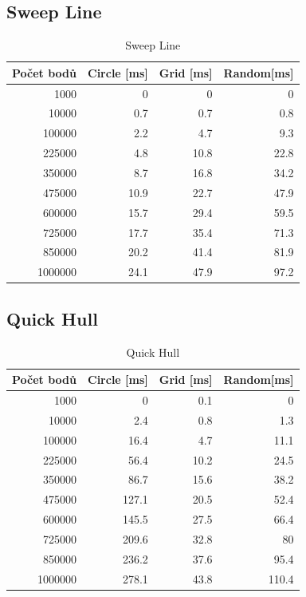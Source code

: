 \documentclass[a4paper, 12pt]{article}
\begin{document}
\subsection{Sweep Line}



\begin{table}[h!]
	\centering
	\begin{tabular}{|r|r|r|r|}
	\hline
	 \textbf{Počet bodů} 	& \textbf{Circle [ms]} & \textbf{Grid [ms]}  & \textbf{Random[ms]} \\ \hline
	 1000 & 0 & 0 & 0   \\ \hline
	10000 & 0.7 & 0.7 & 0.8   \\ \hline
	100000 & 2.2 & 4.7 & 9.3  \\ \hline
	225000 & 4.8 & 10.8 & 22.8   \\ \hline
	350000 & 8.7 & 16.8 & 34.2  \\ \hline
	475000 & 10.9 & 22.7 & 47.9  \\ \hline
	600000 & 15.7 & 29.4 & 59.5   \\ \hline
	725000 & 17.7 & 35.4 & 71.3  \\ \hline
	850000 & 20.2 & 41.4 & 81.9  \\ \hline
	1000000 & 24.1 & 47.9 & 97.2  \\ \hline
	
	\end{tabular}
		\caption{Sweep Line}
\end{table}

\clearpage


\subsection{Quick Hull}


\begin{table}[h!]
	\centering
	\begin{tabular}{|r|r|r|r|}
	\hline
	 \textbf{Počet bodů} 	& \textbf{Circle [ms]} & \textbf{Grid [ms]}  & \textbf{Random[ms]} \\ \hline
	 1000 & 0 & 0.1 & 0   \\ \hline
	10000 & 2.4 & 0.8 & 1.3   \\ \hline
	100000 & 16.4 & 4.7 & 11.1  \\ \hline
	225000 & 56.4 & 10.2 & 24.5   \\ \hline
	350000 & 86.7 & 15.6 & 38.2  \\ \hline
	475000 & 127.1 & 20.5 & 52.4  \\ \hline
	600000 & 145.5 & 27.5 & 66.4   \\ \hline
	725000 & 209.6 & 32.8 & 80  \\ \hline
	850000 & 236.2 & 37.6 & 95.4  \\ \hline
	1000000 & 278.1 & 43.8 & 110.4  \\ \hline
	
	\end{tabular}
		\caption{Quick Hull}
\end{table}
\end{document}
